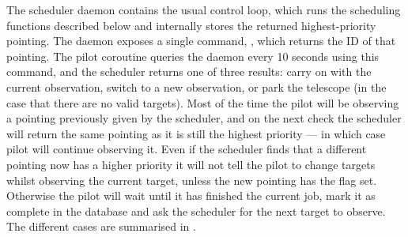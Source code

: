 \begin{colsection}
\begin{colsection}
The scheduler daemon contains the usual control loop, which runs the scheduling functions described below and internally stores the returned highest-priority pointing. The daemon exposes a single command, , which returns the ID of that pointing. The pilot  coroutine queries the daemon every 10 seconds using this command, and the scheduler returns one of three results: carry on with the current observation, switch to a new observation, or park the telescope (in the case that there are no valid targets). Most of the time the pilot will be observing a pointing previously given by the scheduler, and on the next check the scheduler will return the same pointing as it is still the highest priority --- in which case pilot will continue observing it. Even if the scheduler finds that a different pointing now has a higher priority it will not tell the pilot to change targets whilst observing the current target, unless the new pointing has the  flag set. Otherwise the pilot will wait until it has finished the current job, mark it as complete in the database and ask the scheduler for the next target to observe. The different cases are summarised in .



\end{colsection}
\end{colsection}
